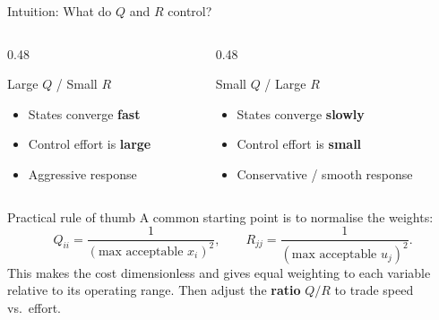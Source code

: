 \documentclass[aspectratio=169,11pt]{beamer}
\begin{document}
\begin{frame}{Intuition: What do $Q$ and $R$ control?}

\begin{columns}[T]
\begin{column}{0.48\textwidth}
\begin{block}{Large $Q$ / Small $R$}
\begin{itemize}
  \item States converge \textbf{fast}
  \item Control effort is \textbf{large}
  \item Aggressive response
\end{itemize}
\end{block}
\end{column}

\begin{column}{0.48\textwidth}
\begin{block}{Small $Q$ / Large $R$}
\begin{itemize}
  \item States converge \textbf{slowly}
  \item Control effort is \textbf{small}
  \item Conservative / smooth response
\end{itemize}
\end{block}
\end{column}
\end{columns}

\vspace{6pt}

\begin{exampleblock}{Practical rule of thumb}
A common starting point is to normalise the weights:
\[
  Q_{ii} = \frac{1}{(\text{max acceptable } x_i)^2}, \qquad
  R_{jj} = \frac{1}{(\text{max acceptable } u_j)^2}.
\]
This makes the cost dimensionless and gives equal weighting to each variable relative to its operating range.  Then adjust the \textbf{ratio} $Q/R$ to trade speed vs.\ effort.
\end{exampleblock}
\end{frame}
\end{document}
